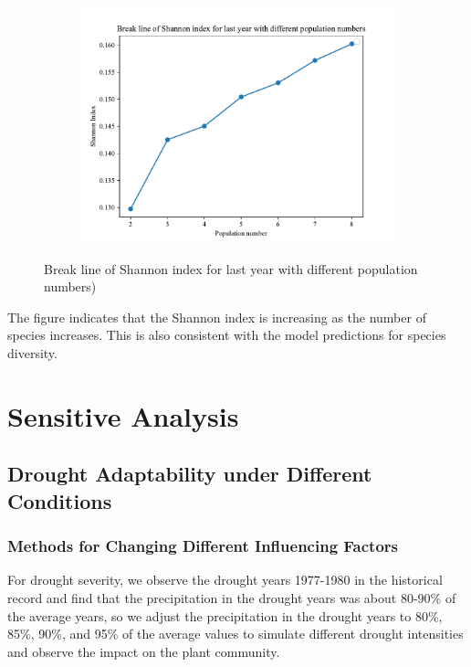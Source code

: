 \documentclass{mcmthesis}
\begin{document}
\begin{figure}[h]
\centering 
\begin{subfigure}{ 0.45\textwidth}
\includegraphics[width=\textwidth]{img/Shannon.pdf}
\end{subfigure}
\caption{Break line of Shannon index for last year with different population numbers)}
\label{fig:Shannon}
\end{figure}

The figure indicates that the Shannon index is increasing as the number of species increases. This is also consistent with the model predictions for species diversity.

\section{Sensitive Analysis}
\subsection{Drought Adaptability under Different Conditions}

\subsubsection{Methods for Changing Different Influencing Factors}

\indent

For drought severity, we observe the drought years 1977-1980 in the historical record and find that the precipitation in the drought years was about 80-90\% of the average years, so we adjust the precipitation in the drought years to 80\%, 85\%, 90\%, and 95\% of the average values to simulate different drought intensities and observe the impact on the plant community. 
\end{document}
